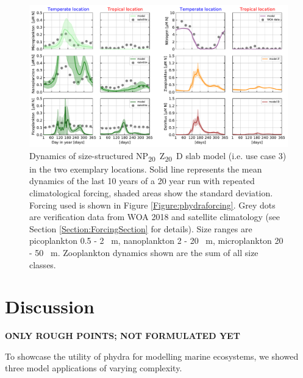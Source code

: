 \documentclass[journal abbreviations, manuscript]{copernicus}
\begin{document}
\begin{figure}[t]
\includegraphics[width=12cm]{Figures/firstdraft_plots/04_sizestruct_slab.pdf}
\caption{Dynamics of size-structured \unit{NP_{20}Z_{20}D} slab model (i.e. use case 3) in the two exemplary locations. Solid line represents the mean dynamics of the last 10 years of a 20 year run with repeated climatological forcing, shaded areas show the standard deviation. Forcing used is shown in Figure \ref{Figure:phydraforcing}. Grey dots are verification data from WOA 2018 and satellite climatology (see Section \ref{Section:ForcingSection} for details). Size ranges are picoplankton 0.5 - 2 \unit{\mu m}, nanoplankton 2 - 20 \unit{\mu m}, microplankton 20 - 50 \unit{\mu m}. Zooplankton dynamics shown are the sum of all size classes.}
\label{Figure:SizeStructuredSlab_results}
\end{figure}







\clearpage


\section{Discussion}

\textbf{ONLY ROUGH POINTS; NOT FORMULATED YET}

To showcase the utility of phydra for modelling marine ecosystems, we showed three model applications of varying complexity.
\end{document}
